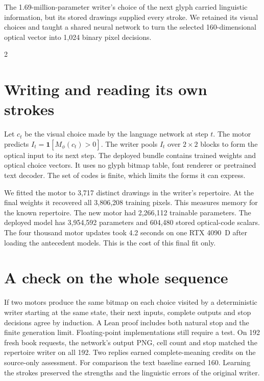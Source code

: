 \newpage
{}
\noindent The 1.69-million-parameter writer's choice of the next glyph carried linguistic information, but its stored drawings supplied every stroke. We retained its visual choices and taught a shared neural network to turn the selected 160-dimensional optical vector into 1,024 binary pixel decisions.
\begin{multicols}{2}
\section*{Writing and reading its own strokes}
Let $c_t$ be the visual choice made by the language network at step $t$. The motor predicts $I_t=\mathbf{1}[M_\phi(c_t)>0]$. The writer pools $I_t$ over $2\times2$ blocks to form the optical input to its next step. The deployed bundle contains trained weights and optical choice vectors. It uses no glyph bitmap table, font renderer or pretrained text decoder. The set of codes is finite, which limits the forms it can express.
\par We fitted the motor to 3,717 distinct drawings in the writer's repertoire. At the final weights it recovered all 3,806,208 training pixels. This measures memory for the known repertoire. The new motor had 2,266,112 trainable parameters. The deployed model has 3,954,592 parameters and 604,480 stored optical-code scalars. The four thousand motor updates took 4.2 seconds on one RTX 4090~D after loading the antecedent models. This is the cost of this final fit only.
\section*{A check on the whole sequence}
If two motors produce the same bitmap on each choice visited by a deterministic writer starting at the same state, their next inputs, complete outputs and stop decisions agree by induction. A Lean proof includes both natural stop and the finite generation limit. Floating-point implementations still require a test. On 192 fresh book requests, the network's output PNG, cell count and stop matched the repertoire writer on all 192. Two replies earned complete-meaning credits on the source-only assessment. For comparison the text baseline earned 160. Learning the strokes preserved the strengths and the linguistic errors of the original writer.
\end{multicols}
